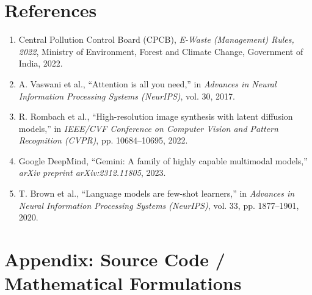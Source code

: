 \documentclass[12pt,a4paper]{article}
\begin{document}
\section{References}
\begin{enumerate}
    \item Central Pollution Control Board (CPCB), \textit{E-Waste (Management) Rules, 2022}, Ministry of Environment, Forest and Climate Change, Government of India, 2022.
    \item A. Vaswani et al., ``Attention is all you need,'' in \textit{Advances in Neural Information Processing Systems (NeurIPS)}, vol. 30, 2017.
    \item R. Rombach et al., ``High-resolution image synthesis with latent diffusion models,'' in \textit{IEEE/CVF Conference on Computer Vision and Pattern Recognition (CVPR)}, pp. 10684--10695, 2022.
    \item Google DeepMind, ``Gemini: A family of highly capable multimodal models,'' \textit{arXiv preprint arXiv:2312.11805}, 2023.
    \item T. Brown et al., ``Language models are few-shot learners,'' in \textit{Advances in Neural Information Processing Systems (NeurIPS)}, vol. 33, pp. 1877--1901, 2020.
\end{enumerate}

\section{Appendix: Source Code / Mathematical Formulations}
\end{document}
